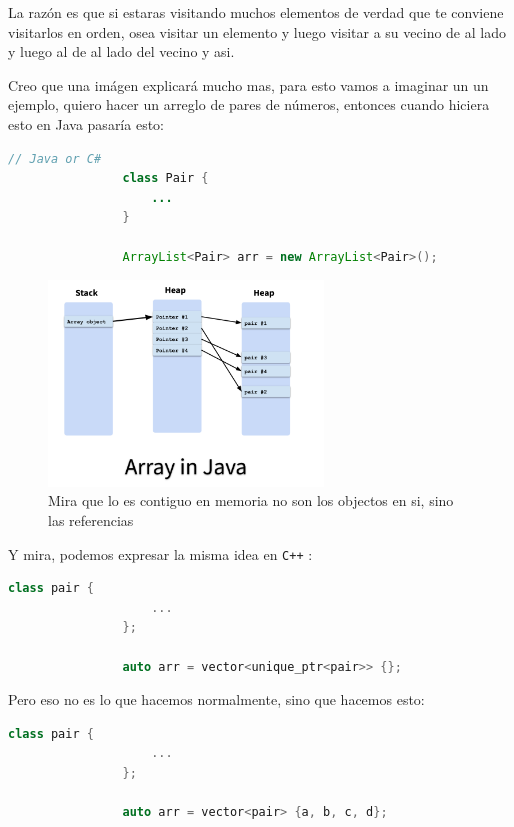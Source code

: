 \documentclass[12pt, fleqn]{report}                             %
\theoremstyle{break}                                            %
\newcommand{\textCode}[1]  { \texttt{#1} }                      %
\newcommand{\Cpp}{\ignorespaces\textCode{C++}}                  %
\begin{document}
            La razón es que si estaras visitando muchos elementos de verdad que te conviene
            visitarlos en orden, osea visitar un elemento y luego visitar a su vecino de al lado
            y luego al de al lado del vecino y asi.

            Creo que una imágen explicará mucho mas, para esto vamos a imaginar un un ejemplo,
            quiero hacer un arreglo de pares de números, entonces cuando hiciera esto en Java pasaría esto:

            \begin{lstlisting}[language=Java, gobble=16]
                // Java or C#
                class Pair {
                    ...
                }

                ArrayList<Pair> arr = new ArrayList<Pair>();
            \end{lstlisting}

            \begin{figure}[h]
                \includegraphics[width=0.65\textwidth]{ArrayJava}
                \caption{Mira que lo es contiguo en memoria no son los objectos en si, sino las referencias}
            \end{figure}

            Y mira, podemos expresar la misma idea en \Cpp:
            \begin{lstlisting}[language=C++, gobble=16]
                class pair {
                    ...
                };

                auto arr = vector<unique_ptr<pair>> {}; 
            \end{lstlisting}

            Pero eso no es lo que hacemos normalmente, sino que hacemos esto:
            \begin{lstlisting}[language=C++, gobble=16]
                class pair {
                    ...
                };

                auto arr = vector<pair> {a, b, c, d}; 
            \end{lstlisting}
\end{document}
